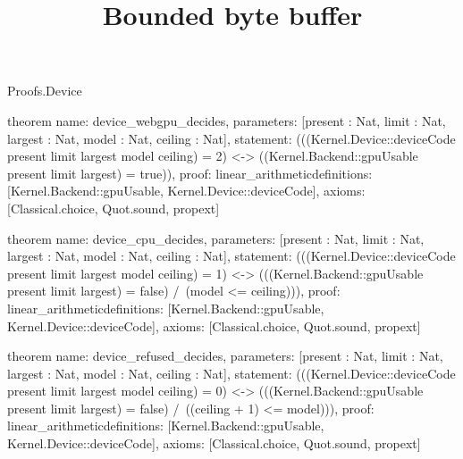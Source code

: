 \begin{lexlean}{Proofs.Device}
\title{Bounded byte buffer}
\begin{semanticmodule}
theorem{
  name: device_webgpu_decides,
  parameters: [present : Nat, limit : Nat, largest : Nat, model : Nat, ceiling : Nat],
  statement: (((Kernel.Device::deviceCode present limit largest model ceiling) = 2) <-> ((Kernel.Backend::gpuUsable present limit largest) = true)),
  proof: linear_arithmetic{definitions: [Kernel.Backend::gpuUsable, Kernel.Device::deviceCode]},
  axioms: [Classical.choice, Quot.sound, propext]
}

theorem{
  name: device_cpu_decides,
  parameters: [present : Nat, limit : Nat, largest : Nat, model : Nat, ceiling : Nat],
  statement: (((Kernel.Device::deviceCode present limit largest model ceiling) = 1) <-> (((Kernel.Backend::gpuUsable present limit largest) = false) /\ (model <= ceiling))),
  proof: linear_arithmetic{definitions: [Kernel.Backend::gpuUsable, Kernel.Device::deviceCode]},
  axioms: [Classical.choice, Quot.sound, propext]
}

theorem{
  name: device_refused_decides,
  parameters: [present : Nat, limit : Nat, largest : Nat, model : Nat, ceiling : Nat],
  statement: (((Kernel.Device::deviceCode present limit largest model ceiling) = 0) <-> (((Kernel.Backend::gpuUsable present limit largest) = false) /\ ((ceiling + 1) <= model))),
  proof: linear_arithmetic{definitions: [Kernel.Backend::gpuUsable, Kernel.Device::deviceCode]},
  axioms: [Classical.choice, Quot.sound, propext]
}
\end{semanticmodule}
\end{lexlean}
